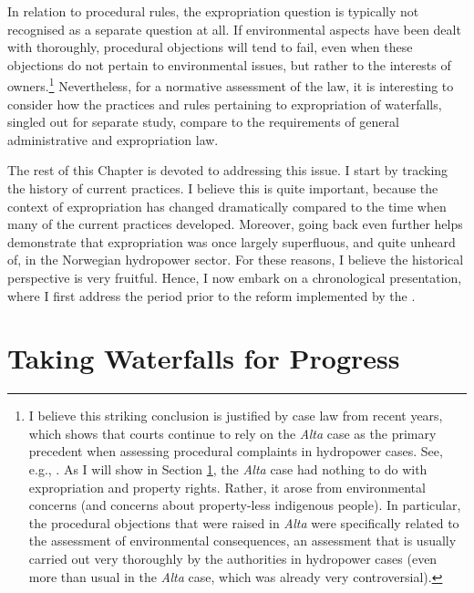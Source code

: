In relation to procedural rules, the expropriation question is typically not recognised as a separate question at all. If environmental aspects have been dealt with thoroughly, procedural objections will tend to fail, even when these objections do not pertain to environmental issues, but rather to the interests of owners.\footnote{I believe this striking conclusion is justified by case law from recent years, which shows that courts continue to rely on the {\it Alta} case as the primary precedent when assessing procedural complaints in hydropower cases. See, e.g., \cite{sauda09,jorpeland11}. As I will show in Section \ref{sec:twp}, the {\it Alta} case had nothing to do with expropriation and property rights. Rather, it arose from environmental concerns (and concerns about property-less indigenous people). In particular, the procedural objections that were raised in {\it Alta} were specifically related to the assessment of environmental consequences, an assessment that is usually carried out very thoroughly by the authorities in hydropower cases (even more than usual in the {\it Alta} case, which was already very controversial).} Nevertheless, for a normative assessment of the law, it is interesting to consider how the practices and rules pertaining to expropriation of waterfalls, singled out for separate study, compare to the requirements of general administrative and expropriation law.

The rest of this Chapter is devoted to addressing this issue. I start by tracking the history of current practices. I believe this is quite important, because the context of expropriation has changed dramatically compared to the time when many of the current practices developed. Moreover, going back even further helps demonstrate that expropriation was once largely superfluous, and quite unheard of, in the Norwegian hydropower sector. For these reasons, I believe the historical perspective is very fruitful. Hence, I now embark on a chronological presentation, where I first address the period prior to the reform implemented by the \cite{ea90}.

\section{Taking Waterfalls for Progress}\label{sec:twp}

